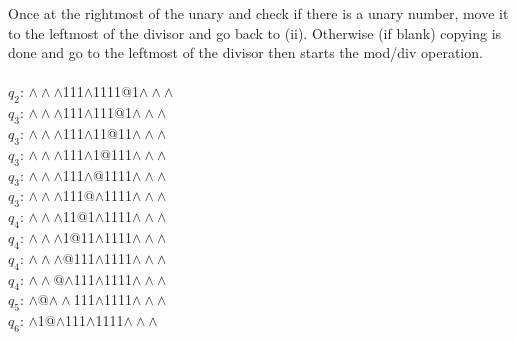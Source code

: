 \documentclass[a4paper]{article} %
\begin{document}
\begin{center}
\begin{varwidth}{\textwidth}
\begin{tasks}[label={(\roman*)},label-width={0.5cm}]
            \task
            Once at the rightmost of the unary and check if there is a unary number, move it to the leftmost of the divisor and go back to (ii). Otherwise (if blank) copying is done and go to the leftmost of the divisor then starts the mod/div operation. \\\\
            $q_2$: $\land\land\land$111$\land$1111@1$\land\land\land$\\
            $q_3$: $\land\land\land$111$\land$111@1$\land\land\land$\\
            $q_3$: $\land\land\land$111$\land$11@11$\land\land\land$\\
            $q_3$: $\land\land\land$111$\land$1@111$\land\land\land$\\
            $q_3$: $\land\land\land$111$\land$@1111$\land\land\land$\\
            $q_3$: $\land\land\land$111@$\land$1111$\land\land\land$\\
            $q_4$: $\land\land\land$11@1$\land$1111$\land\land\land$\\
            $q_4$: $\land\land\land$1@11$\land$1111$\land\land\land$\\
            $q_4$: $\land\land\land$@111$\land$1111$\land\land\land$\\
            $q_4$: $\land\land$@$\land$111$\land$1111$\land\land\land$\\
            $q_5$: $\land$@$\land\land$111$\land$1111$\land\land\land$\\
            $q_6$: $\land$1@$\land$111$\land$1111$\land\land\land$


\end{tasks}
\end{varwidth}
\end{center}
\end{document}
